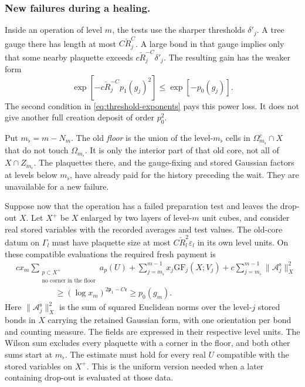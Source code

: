 \documentclass[11pt,letterpaper,reqno]{amsart}
\theoremstyle{definition}
\theoremstyle{remark}
\begin{document}
\subsubsection*{New failures during a healing.}

Inside an operation of level $m$, the tests use the sharper
thresholds $\delta'_j$. A tree gauge there has length at most
$C\check R_j^C$. A large bond in that gauge implies only that
some nearby plaquette exceeds
$c\check R_j^{-C}\delta'_j$. The resulting gain has the weaker
form
\[
 \exp[-c\check R_j^{-C}p_1(g_j)^2]
                           \le\exp[-p_0(g_j)].
\]
The second condition in \eqref{eq:threshold-exponents} pays
this power loss. It does not give another full creation deposit
of order $p_0^2$.

Put $m_\flat=m-N_m$. The old \emph{floor} is the union of the
level-$m_\flat$ cells in $\Omega_{m_\flat}^c\cap X$ that do
not touch $\Omega_{m_\flat}$. It is only the interior part of
that old core, not all of $X\cap Z_{m_\flat}$. The plaquettes
there, and the gauge-fixing and stored Gaussian factors at levels
below $m_\flat$, have already paid for the history preceding
the wait. They are unavailable for a new failure.

Suppose now that the operation has a failed preparation test and
leaves the drop-out $X$. Let $X^+$ be $X$ enlarged by two layers
of level-$m$ unit cubes, and consider real stored variables with
the recorded averages and test values. The old-core datum on
$\Gamma_l$ must have plaquette size at most
$C\check R_l^2\varepsilon_l$ in its own level units. On these
compatible evaluations the required fresh payment is
\begin{equation}\label{eq:fresh-failure-payment}
 \begin{split}
 &c x_m\!\!\sum_{\substack{p\subset X^+\\
                         \text{no corner in the floor}}}\!\!a_p(U)
       +\sum_{j=m_\flat}^{m-1}x_j\mathrm{GF}_j(X;V_j)
       +c\sum_{j=m_\flat}^{m-1}
                           \|\mathcal A_j^{\mathrm s}\|_X^2\\
 &\hspace{2cm}\ge(\log x_m)^{2\mathfrak p_1-C\mathfrak r}
                             \ge p_0(g_m).
 \end{split}
\end{equation}
Here $\|\mathcal A_j^{\mathrm s}\|_X^2$ is the sum of squared
Euclidean norms over the level-$j$ stored bonds in $X$ carrying
the retained Gaussian form, with one orientation per bond and
counting measure. The fields are expressed in their respective
level units. The Wilson sum excludes every plaquette with a corner
in the floor, and both other sums start at $m_\flat$. The
estimate must hold for every real $U$ compatible with the
stored variables on $X^+$. This is the uniform version needed
when a later containing drop-out is evaluated at those data.
\end{document}
